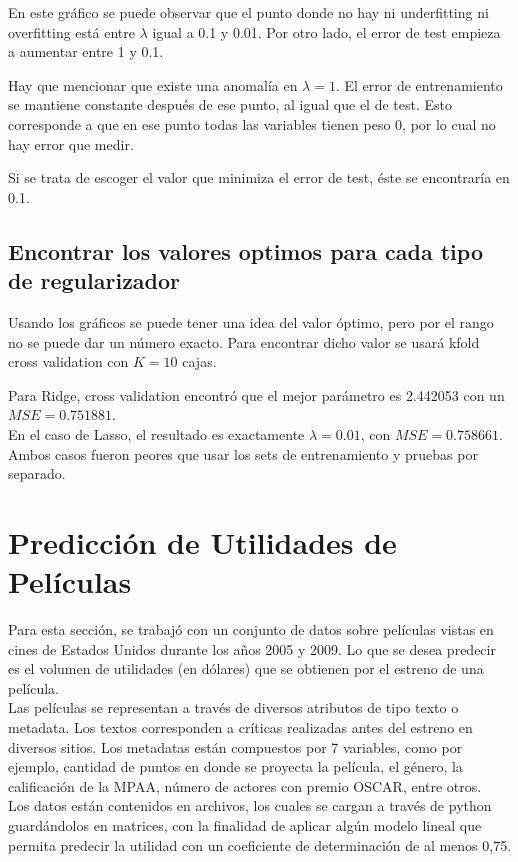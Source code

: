 \documentclass[letter, 10pt]{article}
\begin{document}
En este gráfico se puede observar que el punto donde no hay ni underfitting ni
overfitting está entre $\lambda$ igual a 0.1 y 0.01. Por otro lado, el error de
test empieza a aumentar entre 1 y 0.1.

Hay que mencionar que existe una anomalía en $\lambda = 1$. El error de
entrenamiento se mantiene constante después de ese punto, al igual que el de
test. Esto corresponde a que en ese punto todas las variables tienen peso 0, por
lo cual no hay error que medir.

Si se trata de escoger el valor que minimiza el error de test, éste se
encontraría en 0.1.
\subsection{Encontrar los valores optimos para cada tipo de regularizador}
Usando los gráficos se puede tener una idea del valor óptimo, pero por el rango
no se puede dar un número exacto. Para encontrar dicho valor se usará kfold
cross validation con $K = 10$ cajas.

Para Ridge, cross validation encontró que el mejor parámetro es 2.442053 con un
$MSE = 0.751881$. \\

En el caso de Lasso, el resultado es exactamente $\lambda = 0.01$, con $MSE =
0.758661$.\\

Ambos casos fueron peores que usar los sets de entrenamiento y pruebas por
separado.
\section{Predicción de Utilidades de Películas}

Para esta sección, se trabajó con un conjunto de datos sobre películas vistas en cines de Estados Unidos durante los años 2005 y 2009. Lo que se desea predecir es el volumen de utilidades (en dólares) que se obtienen por el estreno de una película.\\

Las películas se representan a través de diversos atributos de tipo texto o metadata. Los textos corresponden a críticas realizadas antes del estreno en diversos sitios. Los metadatas están compuestos por 7 variables, como por ejemplo, cantidad de puntos en donde se proyecta la película, el género, la calificación de la MPAA, número de actores con premio OSCAR, entre otros.\\

Los datos están contenidos en archivos, los cuales se cargan a través de python guardándolos en matrices, con la finalidad de aplicar algún modelo lineal que permita predecir la utilidad con un coeficiente de determinación de al menos 0,75.\\
\end{document}
